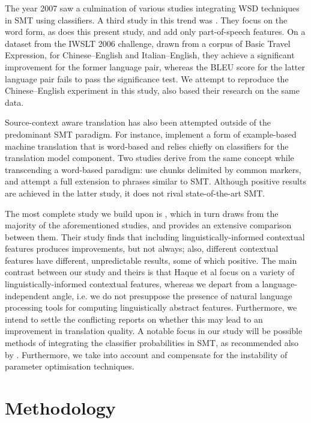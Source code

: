 The year 2007 saw a culmination of various studies integrating WSD techniques
in SMT using classifiers. A third study in this trend was \cite{Stroppa+07}.
They focus on the word form, as does this present study, and add only
part-of-speech features. On a dataset from the IWSLT 2006 challenge, drawn from
a corpus of Basic Travel Expression, for Chinese--English and Italian--English,
they achieve a significant improvement for the former language pair, whereas
the BLEU score for the latter language pair fails to pass the significance
test. We attempt to reproduce the Chinese--English experiment in this study,
\cite{CarpuatWu07} also based their research on the same data.

Source-context aware translation has also been attempted outside of the
predominant SMT paradigm. For instance, \cite{MBMT} implement a
form of example-based machine translation that is word-based and relies
chiefly on classifiers for the translation model component. Two studies derive
from the same concept while transcending a word-based paradigm:
\cite{MARKERBASED} use chunks delimited by common markers, and \cite{PBMBMT}
attempt a full extension to phrases similar to SMT. Although positive results
are achieved in the latter study, it does not rival state-of-the-art SMT.

The most complete study we build upon is \cite{Rejwanul+11}, which in turn
draws from the majority of the aforementioned studies, and provides an
extensive comparison between them. Their study finds that including
linguistically-informed contextual features produces improvements, but not
always; also, different contextual features have different, unpredictable
results, some of which positive. The main contrast between our study and theirs
is that Haque et al focus on a variety of linguistically-informed contextual
features, whereas we depart from a language-independent angle, i.e. we do not
presuppose the presence of natural language processing tools for computing
linguistically abstract features. Furthermore, we intend to settle the
conflicting reports on whether this may lead to an improvement in translation
quality. A notable focus in our study will be possible methods of integrating
the classifier probabilities in SMT, as recommended also by
\cite{Gimenez+07}. Furthermore, we take into account and compensate for the
instability of parameter optimisation techniques.


\section{Methodology}
\label{sec:methodology}

